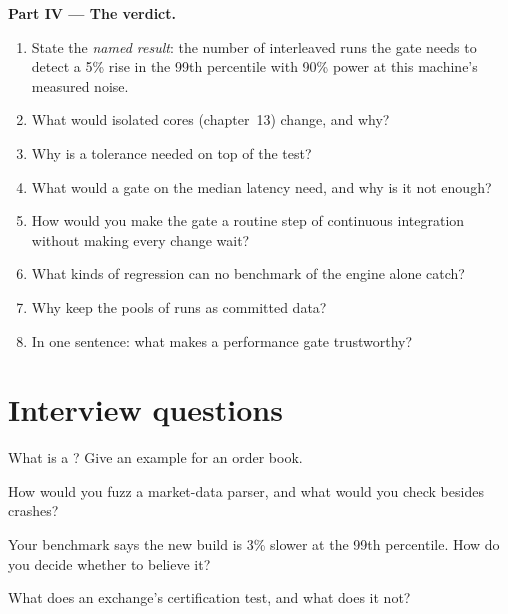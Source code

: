 \begin{problem}
\medskip\noindent\textbf{Part IV --- The verdict.}
\begin{enumerate}[resume]
\item State the \emph{named result}: the number of interleaved runs the gate needs to detect a 5\% rise in the 99th percentile
with 90\% power at this machine's measured noise.
\item What would isolated cores (chapter~13) change, and why?
\item Why is a tolerance needed on top of the test?
\item What would a gate on the median latency need, and why is it not enough?
\item How would you make the gate a routine step of continuous integration without making every change wait?
\item What kinds of regression can no benchmark of the engine alone catch?
\item Why keep the pools of runs as committed data?
\item In one sentence: what makes a performance gate trustworthy?
\end{enumerate}
\end{problem}

\section{Interview questions}

\begin{interviewq}\label{iq:ll:testing-and-deploying-low-latency-systems:1}
What is a ? Give an example for an order book.
\end{interviewq}

\begin{interviewq}\label{iq:ll:testing-and-deploying-low-latency-systems:2}
How would you fuzz a market-data parser, and what would you check besides crashes?
\end{interviewq}

\begin{interviewq}\label{iq:ll:testing-and-deploying-low-latency-systems:3}
Your benchmark says the new build is 3\% slower at the 99th percentile. How do you decide whether to believe it?
\end{interviewq}

\begin{interviewq}\label{iq:ll:testing-and-deploying-low-latency-systems:4}
What does an exchange's certification test, and what does it not?
\end{interviewq}

